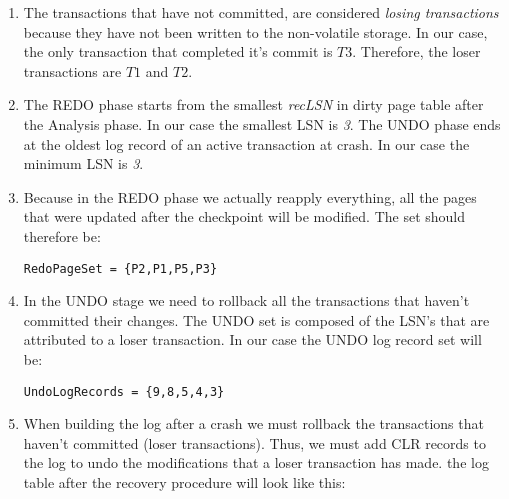 \documentclass{article}      %
\begin{document}
\begin{enumerate}
\item %
The transactions that have not committed, are considered \emph{losing transactions} because they have not been written to the non-volatile storage. In our case, the only transaction that completed it's commit is $T3$. Therefore, the loser transactions are $T1$ and $T2$.\\

\item %
The REDO phase starts from the smallest \emph{recLSN} in dirty page table after the Analysis phase. In our case the smallest LSN is \emph{3}. The UNDO phase ends at the oldest log record of an active transaction at crash. In our case the minimum LSN is \emph{3}.\\

\item %
Because in the REDO phase we actually reapply everything, all the pages that were updated after the checkpoint will be modified. The set should therefore be:
\begin{verbatim}
RedoPageSet = {P2,P1,P5,P3}
\end{verbatim}

\item %
In the UNDO stage we need to rollback all the transactions that haven't committed their changes. The UNDO set is composed of the LSN's that are attributed to a loser transaction. In our case the UNDO log record set will be:
\begin{verbatim}
UndoLogRecords = {9,8,5,4,3}
\end{verbatim}

\item %
When building the log after a crash we must rollback the transactions that haven't committed (loser transactions). Thus, we must add CLR records to the log to undo the modifications that a loser transaction has made. the log table after the recovery procedure will look like this:


\end{enumerate}
\end{document}
